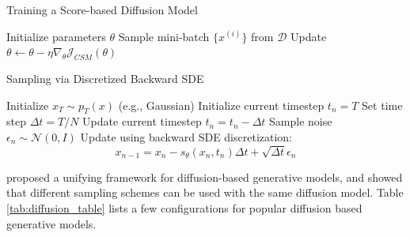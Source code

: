 \begin{multicols}{2}

\begin{algorithm}[H]
\caption{Training a Score-based Diffusion Model}
\begin{algorithmic}[1]\label{algo:train_diffusion}
\State Initialize parameters $\theta$
    \State Sample mini-batch $\{x^{(i)}\}$ from $\mathcal{D}$
    \State Update $\theta \gets \theta - \eta \nabla_\theta \mathcal{J}_{CSM}(\theta)$
\EndWhile
\State {}
\end{algorithmic}
\end{algorithm}

\columnbreak

\begin{algorithm}[H]
\caption{Sampling via Discretized Backward SDE}
\begin{algorithmic}[1]\label{algo:sample_diffusion}
\State Initialize $x_T \sim p_T(x)$ (e.g., Gaussian)
\State Initialize current timestep $t_{n} = T$
    \State Set time step $\Delta t = T / N$
    \State Update current timestep $t_{n} = t_{n} - \Delta t$
    \State Sample noise $\epsilon_n \sim \mathcal{N}(0, I)$
    \State Update using backward SDE discretization:
    \[
    x_{n-1} = x_n - s_\theta(x_n, t_n) \Delta t + \sqrt{\Delta t} \epsilon_n
    \]
\EndFor
\State {}
\end{algorithmic}
\end{algorithm}

\end{multicols}
\citep{karras2022elucidatingdesignspacediffusionbased} proposed a unifying framework for diffusion-based generative models, and showed that different sampling schemes can be used with the same diffusion model. 
Table \ref{tab:diffusion_table} lists a few configurations for popular diffusion based generative models. 

